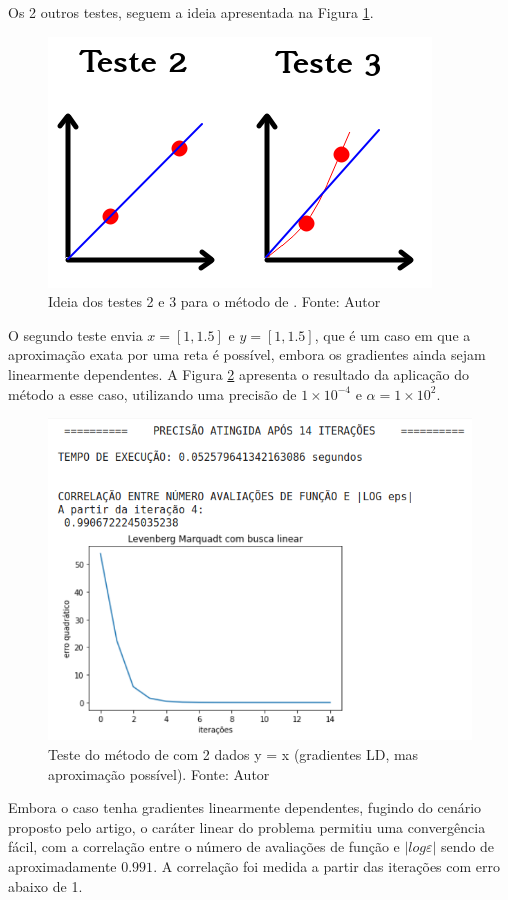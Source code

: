\documentclass[11pt]{article}
\begin{document}
Os 2 outros testes, seguem a ideia apresentada na Figura \ref{t23}.
\begin{figure}[H]
\center
\includegraphics[scale=0.5]{Figuras/2testes.png}
\caption{Ideia dos testes 2 e 3 para o método de  \cite{bmLS}. Fonte: Autor} 
\label{t23}
\end{figure}
O segundo teste envia $x = [1,1.5]$ e $y = [1,1.5]$, que é um caso em que a aproximação exata por uma reta é possível, embora os gradientes ainda sejam linearmente dependentes. A Figura \ref{lmbl2} apresenta o resultado da aplicação do método a esse caso, utilizando uma precisão de $1\times10^{-4}$ e $\alpha = 1\times10^{2}$.
\begin{figure}[H]
\center
\includegraphics[scale=0.7]{Figuras/lmbl2.png}
\caption{Teste do método de  \cite{bmLS} com 2 dados y = x (gradientes LD, mas aproximação possível). Fonte: Autor} 
\label{lmbl2}
\end{figure}

Embora o caso tenha gradientes linearmente dependentes, fugindo do cenário proposto pelo artigo, o caráter linear do problema permitiu uma convergência fácil, com a correlação entre o número de avaliações de função e $|log \varepsilon|$ sendo de aproximadamente $0.991$. A correlação foi medida a partir das iterações com erro abaixo de 1.
\end{document}
